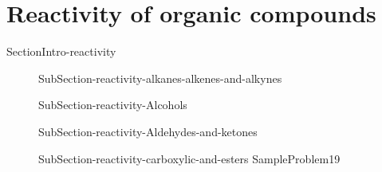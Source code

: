 \documentclass[main.tex]{subfiles}
\begin{document}
{ 
\section{Reactivity of organic compounds}{SectionIntro-reactivity}
\sloppy\begin{description}
\item[] {SubSection-reactivity-alkanes-alkenes-and-alkynes}
\item[] {SubSection-reactivity-Alcohols}
 \item[] {SubSection-reactivity-Aldehydes-and-ketones}
 \item[] {SubSection-reactivity-carboxylic-and-esters}
  {SampleProblem19}
 \end{description}
 
 }
 
 
\checkoddpage\ifoddpage \clearpage\thispagestyle{empty}\mbox{}\clearpage \else  \fi 
\end{document}
